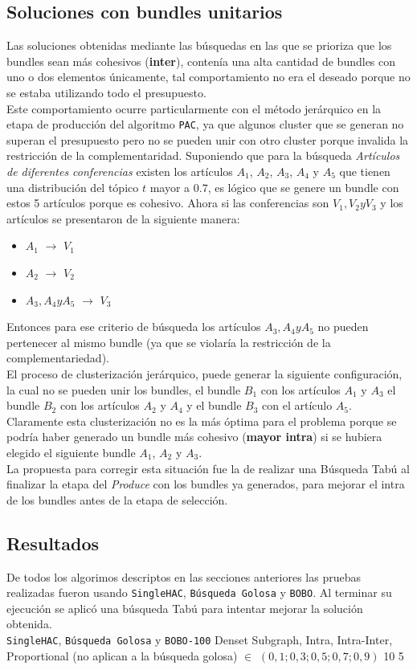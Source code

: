 \subsection{Soluciones con bundles unitarios}
Las soluciones obtenidas mediante las búsquedas en las que se prioriza que los bundles sean más cohesivos (\textbf{inter}), contenía una alta cantidad de bundles con uno o dos elementos únicamente, tal comportamiento no era el deseado porque no se estaba utilizando todo el presupuesto.\\
Este comportamiento ocurre particularmente con el método jerárquico en la etapa de producción del algoritmo \texttt{PAC}, ya que algunos cluster que se generan no superan el presupuesto pero no se pueden unir con otro cluster porque invalida la restricción de la complementaridad. Suponiendo que para la búsqueda \textit{Artículos de diferentes conferencias} existen los artículos $A_1$, $A_2$, $A_3$, $A_4$ y $A_5$ que tienen una distribución del tópico $t$ mayor a $0.7$, es lógico que se genere un bundle con estos 5 artículos porque es cohesivo. Ahora si las conferencias son $V_1, V_2 y V_3$ y los artículos se presentaron de la siguiente manera:
\begin{itemize}
	\item $A_1$ $\rightarrow$ $V_1$
	\item $A_2$ $\rightarrow$ $V_2$
	\item $A_3, A_4 y A_5$ $\rightarrow$ $V_3$
\end{itemize} 

Entonces para ese criterio de búsqueda los artículos $A_3, A_4 y A_5$ no pueden pertenecer al mismo bundle (ya que se violaría la restricción de la complementariedad).\\
El proceso de clusterización jerárquico, puede generar la siguiente configuración, la cual no se pueden unir los bundles, el bundle $B_1$ con los artículos $A_1$ y $A_3$ el bundle $B_2$ con los artículos $A_2$ y $A_4$ y el bundle $B_3$ con el artículo $A_5$. Claramente esta clusterización no es la más óptima para el problema porque se podría haber generado un bundle más cohesivo (\textbf{mayor intra}) si se hubiera elegido el siguiente bundle $A_1$, $A_2$ y $A_3$.\\
La propuesta para corregir esta situación fue la de realizar una Búsqueda Tabú al finalizar la etapa del \textit{Produce} con los bundles ya generados, para mejorar el intra de los bundles antes de la etapa de selección.
\subsection{Resultados}
De todos los algorimos descriptos en las secciones anteriores las pruebas realizadas fueron usando \texttt{SingleHAC}, \texttt{Búsqueda Golosa} y \texttt{BOBO}. Al terminar su ejecución se aplicó una búsqueda Tabú para intentar mejorar la solución obtenida.\\
\Solucion
{}
{\texttt{SingleHAC}, \texttt{Búsqueda Golosa} y \texttt{BOBO-100}}
{Denset Subgraph, Intra, Intra-Inter, Proportional (no aplican a la búsqueda golosa)}
{$\in$ $(0,1; 0,3; 0,5; 0,7; 0,9)$}
{10}
{5}

